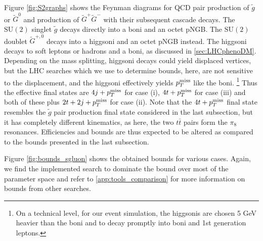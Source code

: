 \documentclass[preprintnumbers,nofootinbib,showpacs,eqsecnum,pre,12pt]{revtex4-1}
\newcommand{\SU}{\text{SU}}
\def\ptmiss{p_{T}^{\rm miss}}
\begin{document}
Figure \ref{fig:S2graphs} shows the Feynman diagrams for QCD pair production of $\tilde g$ or $\tilde G^0$ and production of $\tilde G^+\tilde G^-$ with their subsequent cascade decays.
The $\SU(2)$ singlet $\tilde{g}$ decays directly into a boni and an octet pNGB. The $\SU(2)$ doublet $\tilde{G}^{+,0}$ decays into a higgsoni and an octet pNGB instead. The higgsoni decays to soft leptons or hadrons and a boni, as discussed in \cref{sec:LHCphenoDM}. Depending on the mass splitting, higgsoni decays could yield displaced vertices, but the LHC searches which we use to determine bounds, here, are not sensitive to the displacement, and the higgsoni effectively yields $\ptmiss$ like the boni. \footnote{On a technical level, for our event simulation, the higgsonis are chosen 5 GeV heavier than the boni and to decay promptly into boni and 1st generation leptons.} 
Thus the effective final states are $4j + \ptmiss$ for case (i), $4t + \ptmiss$ for case (iii) and both of these plus $2t + 2j + \ptmiss$ for case (ii). Note that the $4t + \ptmiss$ final state resembles the $\tilde{g}$ pair production final state considered in the last subsection, but it has completely different kinematics, as here, the two $t\bar{t}$ pairs form the $\pi_8$ resonances. Efficiencies and bounds are thus expected to be altered as compared to the bounds presented in the last subsection.

Figure \ref{fig:bounds_sgluon} shows the obtained bounds for various cases. Again, we find the implemented search \cite{CMS:2019zmd} to dominate the bound over most of the parameter space and refer to \cref{app:tools_comparison} for more information on bounds from other searches. 
\end{document}
